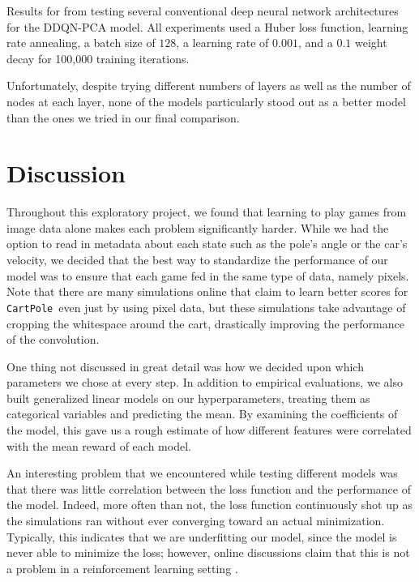 \documentclass[11pt]{article}
\newcommand{\cp}{\texttt{CartPole}}
\begin{document}
\begin{table*}[!ht]
    \footnotesize
    \centering
    
    
    \caption{Results for from testing several conventional deep neural network architectures for the DDQN-PCA model. All experiments used a Huber loss function, learning rate annealing, a batch size of $128$, a learning rate of $0.001$, and a $0.1$ weight decay for 100,000 training iterations.}
    \label{tab:model_selection_ddqn_pca_4}
\end{table*}

Unfortunately, despite trying different numbers of layers as well as the number of nodes at each layer, none of the models particularly stood out as a better model than the ones we tried in our final comparison.

\section{Discussion}

Throughout this exploratory project, we found that learning to play games from image data alone makes each problem significantly harder. While we had the option to read in metadata about each state such as the pole's angle or the car's velocity, we decided that the best way to standardize the performance of our model was to ensure that each game fed in the same type of data, namely pixels. Note that there are many simulations online that claim to learn better scores for \cp~even just by using pixel data, but these simulations take advantage of cropping the whitespace around the cart, drastically improving the performance of the convolution.

One thing not discussed in great detail was how we decided upon which parameters we chose at every step. In addition to empirical evaluations, we also built generalized linear models on our hyperparameters, treating them as categorical variables and predicting the mean. By examining the coefficients of the model, this gave us a rough estimate of how different features were correlated with the mean reward of each model.

An interesting problem that we encountered while testing different models was that there was little correlation between the loss function and the performance of the model. Indeed, more often than not, the loss function continuously shot up as the simulations ran without ever converging toward an actual minimization. Typically, this indicates that we are underfitting our model, since the model is never able to minimize the loss; however, online discussions claim that this is not a problem in a reinforcement learning setting \cite{stackexchange2017loss}.
\end{document}
